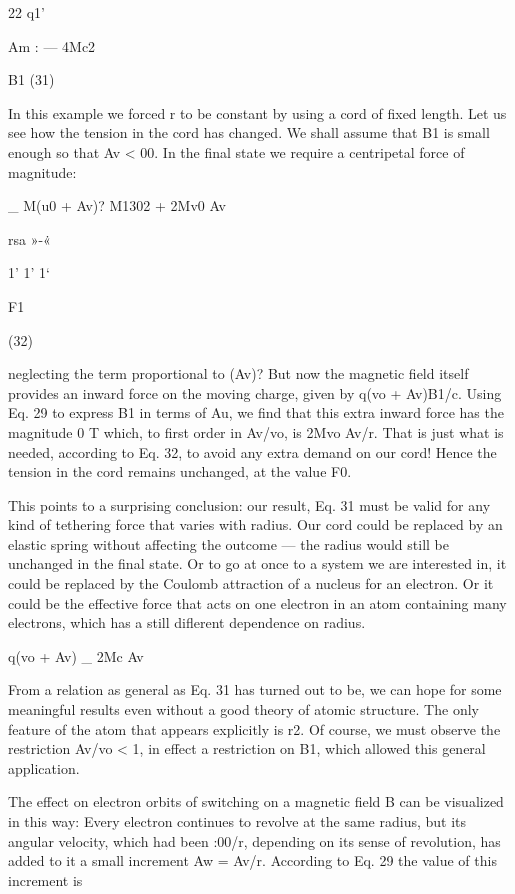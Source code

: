 {22
q1'

Am :  ---  4Mc2

B1 (31)

In this example we forced r to be constant by using a cord of fixed
length. Let us see how the tension in the cord has changed. We
shall assume that B1 is small enough so that Av < 00. In the final
state we require a centripetal force of magnitude:
\begin{equation}
\end{equation}

_ M(u0 + Av)? M1302 + 2Mv0 Av

rsa
»-\.«

1' 1' 1‘

F1

(32)

neglecting the term proportional to (Av)? But now the magnetic
field itself provides an inward force on the moving charge, given by
q(vo + Av)B1/c. Using Eq. 29 to express B1 in terms of Au, we find
that this extra inward force has the magnitude 0 T
which, to first order in Av/vo, is 2Mvo Av/r. That is just what is
needed, according to Eq. 32, to avoid any extra demand on our cord!
Hence the tension in the cord remains unchanged, at the value F0.

This points to a surprising conclusion: our result, Eq. 31 must be
valid for any kind of tethering force that varies with radius. Our
cord could be replaced by an elastic spring without affecting the
outcome --- the radius would still be unchanged in the final state.
Or to go at once to a system we are interested in, it could be replaced
by the Coulomb attraction of a nucleus for an electron. Or it could
be the effective force that acts on one electron in an atom containing
many electrons, which has a still diflerent dependence on radius.

\begin{equation}
\end{equation}
q(vo + Av) _ 2Mc Av

From a relation as general as Eq. 31 has turned out to be, we can hope
for some meaningful results even without a good theory of atomic
structure. The only feature of the atom that appears explicitly is r2.
Of course, we must observe the restriction Av/vo < 1, in effect a
restriction on B1, which allowed this general application.

The effect on electron orbits of switching on a magnetic field B can
be visualized in this way: Every electron continues to revolve at the
same radius, but its angular velocity, which had been :00/r, depending
on its sense of revolution, has added to it a small increment
Aw = Av/r. According to Eq. 29 the value of this increment is
\begin{equation}
\end{equation}

}

